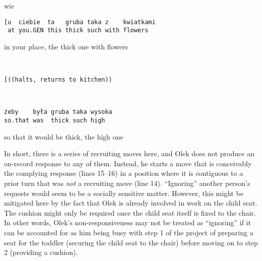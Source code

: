 \documentclass[output=paper]{langsci/langscibook}
\begin{document}
%
\begin{mdframednoverticalspace}[style=firstfoc]
\begin{transbox}{17}{wie}
\begin{verbatim}
[u  ciebie  ta   gruba taka z    kwiatkami
 at you.GEN this thick such with flowers
\end{verbatim}
\hspace{0.07cm} in your place, the thick one with flowers
\end{transbox}
\end{mdframednoverticalspace}
%
\begin{transbox}{18}{~}
\begin{verbatim}
[((halts, returns to kitchen))
\end{verbatim}
\end{transbox}
%
\begin{mdframednoverticalspace}[style=firstfoc]
\begin{transbox}{19}{~}
\begin{verbatim}
żeby    była gruba taka wysoka
so.that was  thick such high
\end{verbatim}
so that it would be thick, the high one
\end{transbox}
\end{mdframednoverticalspace}
%
\clearpage

In short, there is a series of recruiting moves here, and Olek does not produce an on-record response to any of them.  Instead, he starts a move that is conceivably the complying response (lines 15--16) in a position where it is contiguous to a prior turn that was \textit{not} a recruiting move (line 14).  ``Ignoring'' another person’s requests would seem to be a socially sensitive matter.  However, this might be mitigated here by the fact that Olek is already involved in work on the child seat.  The cushion might only be required once the child seat itself is fixed to the chair.  In other words, Olek’s non-responsiveness may not be treated as ``ignoring'' if it can be accounted for as him being busy with step 1 of the project of preparing a seat for the toddler (securing the child seat to the chair) before moving on to step 2 (providing a cushion).
\end{document}
